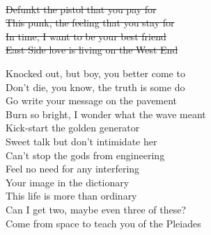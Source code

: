 \begin{footnotesize}
	{\color{gray}\sout{
			\\
			Defunkt the pistol that you pay for \\
			This punk, the feeling that you stay for \\
			In time, I want to be your best friend \\
			East Side love is living on the West End \\
		}}
\end{footnotesize}

Knocked out, but boy, you better come to \\
Don't die, you know, the truth is some do \\
Go write your message on the pavement \\
Burn so bright, I wonder what the wave meant \\

Kick-start the golden generator \\
Sweet talk but don't intimidate her \\
Can't stop the gods from engineering \\
Feel no need for any interfering \\

Your image in the dictionary \\
This life is more than ordinary \\
Can I get two, maybe even three of these? \\
Come from space to teach you of the Pleiades \\

